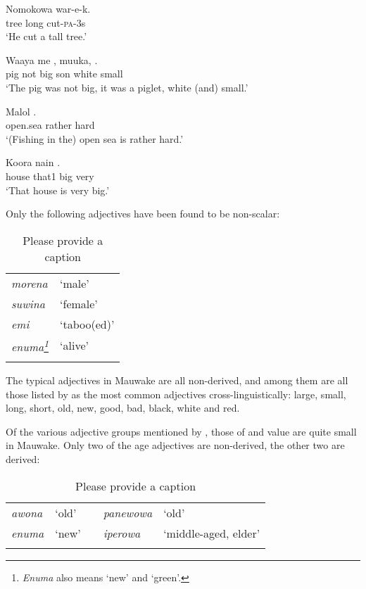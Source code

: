 \ea%
\label{ex:3:x70}
\gll Nomokowa  war-e-k. \\
tree long cut-\textsc{pa}-3s\\
\glt`He cut a tall tree.'
\z

\ea%
\label{ex:3:x71}
\gll Waaya me , muuka,  . \\
pig not big son white small\\
\glt`The pig was not big, it was a piglet, white (and) small.'
\z

\ea%
\label{ex:3:x72}
\gll Malol  . \\
open.sea rather hard\\
\glt`(Fishing in the) open sea is rather hard.'
\z

\ea%
\label{ex:3:x73}
\gll Koora nain  . \\
house that1 big very\\
\glt`That house is very big.'
\z

Only the following adjectives have been found to be non-scalar:

\begin{table}
\caption{Please provide a caption}
\label{}
\begin{tabular}{>{\itshape}ll}
\mytoprule
morena &`male'\\
suwina &`female'\\
emi &`taboo(ed)'\\
enuma\footnote{\textit{Enuma} also means `new' and `green'.} &`alive'\\
\mybottomrule
\end{tabular}
\end{table}

The typical adjectives in Mauwake are all non-derived, and among them are all those listed by \citet[23]{Dixon1977} as the most common adjectives cross-linguistically: large, small, long, short, old, new, good, bad, black, white and red.

Of the various adjective groups mentioned by \citet{Dixon1977}, those of  and value are quite small in Mauwake. Only two of the age adjectives are non-derived, the other two are derived:

\begin{table}
\caption{Please provide a caption}
\label{}
\begin{tabular}{>{\itshape}llc>{\itshape}ll}
\mytoprule
awona &`old' && panewowa &`old'\\
enuma &`new' && iperowa &`middle-aged, elder'\\ 
\mybottomrule
\end{tabular}
\end{table}

